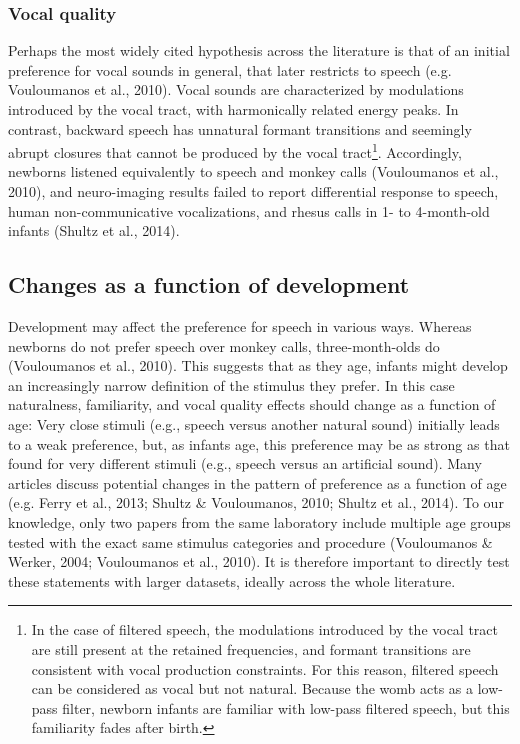 \documentclass[man]{apa6}
\let\rmarkdownfootnote\footnote%
\def\footnote{\protect\rmarkdownfootnote}
\begin{document}
\subsubsection{Vocal quality}\label{vocal-quality}

Perhaps the most widely cited hypothesis across the literature is that
of an initial preference for vocal sounds in general, that later
restricts to speech (e.g. Vouloumanos et al., 2010). Vocal sounds are
characterized by modulations introduced by the vocal tract, with
harmonically related energy peaks. In contrast, backward speech has
unnatural formant transitions and seemingly abrupt closures that cannot
be produced by the vocal tract\footnote{In the case of filtered speech,
  the modulations introduced by the vocal tract are still present at the
  retained frequencies, and formant transitions are consistent with
  vocal production constraints. For this reason, filtered speech can be
  considered as vocal but not natural. Because the womb acts as a
  low-pass filter, newborn infants are familiar with low-pass filtered
  speech, but this familiarity fades after birth.}. Accordingly,
newborns listened equivalently to speech and monkey calls (Vouloumanos
et al., 2010), and neuro-imaging results failed to report differential
response to speech, human non-communicative vocalizations, and rhesus
calls in 1- to 4-month-old infants (Shultz et al., 2014).

\subsection{Changes as a function of
development}\label{changes-as-a-function-of-development}

Development may affect the preference for speech in various ways.
Whereas newborns do not prefer speech over monkey calls,
three-month-olds do (Vouloumanos et al., 2010). This suggests that as
they age, infants might develop an increasingly narrow definition of the
stimulus they prefer. In this case naturalness, familiarity, and vocal
quality effects should change as a function of age: Very close stimuli
(e.g., speech versus another natural sound) initially leads to a weak
preference, but, as infants age, this preference may be as strong as
that found for very different stimuli (e.g., speech versus an artificial
sound). Many articles discuss potential changes in the pattern of
preference as a function of age (e.g. Ferry et al., 2013; Shultz \&
Vouloumanos, 2010; Shultz et al., 2014). To our knowledge, only two
papers from the same laboratory include multiple age groups tested with
the exact same stimulus categories and procedure (Vouloumanos \& Werker,
2004; Vouloumanos et al., 2010). It is therefore important to directly
test these statements with larger datasets, ideally across the whole
literature.
\end{document}
